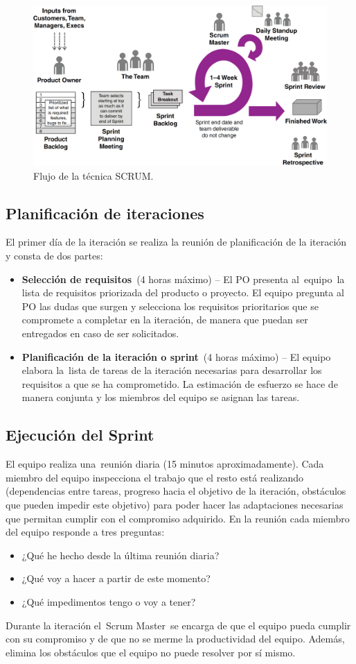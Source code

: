 \begin{figure}[H]
\centering
\includegraphics[width=125mm,scale=1]{Figuras/flujo_scrum}
\caption{Flujo de la técnica SCRUM.}
  \label{flujo_scrum}
\end{figure}

\subsection{Planificación de iteraciones}
El primer día de la iteración se realiza la reunión de planificación de la iteración y consta de dos partes:
\begin{itemize}
    \item \textbf{Selección de requisitos} (4 horas máximo) – El PO presenta al equipo la lista de requisitos priorizada del producto o proyecto. El equipo pregunta al PO las dudas que surgen y selecciona los requisitos prioritarios que se compromete a completar en la iteración, de manera que puedan ser entregados en caso de ser solicitados.
    \item \textbf{Planificación de la iteración o sprint} (4 horas máximo) – El equipo elabora la lista de tareas de la iteración necesarias para desarrollar los requisitos a que se ha comprometido. La estimación de esfuerzo se hace de manera conjunta y los miembros del equipo se asignan las tareas.
\end{itemize}

\subsection{Ejecución del Sprint}
El equipo realiza una reunión diaria (15 minutos aproximadamente). Cada miembro del equipo inspecciona el trabajo que el resto está realizando (dependencias entre tareas, progreso hacia el objetivo de la iteración, obstáculos que pueden impedir este objetivo) para poder hacer las adaptaciones necesarias que permitan cumplir con el compromiso adquirido. En la reunión cada miembro del equipo responde a tres preguntas:
\begin{itemize}
    \item ¿Qué he hecho desde la última reunión diaria?
    \item ¿Qué voy a hacer a partir de este momento?
    \item ¿Qué impedimentos tengo o voy a tener?
\end{itemize}
Durante la iteración el Scrum Master se encarga de que el equipo pueda cumplir con su compromiso y de que no se merme la productividad del equipo. Además, elimina los obstáculos que el equipo no puede resolver por sí mismo.

